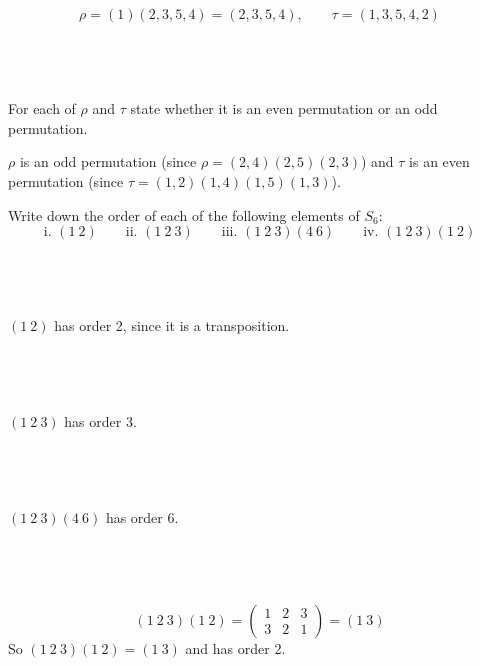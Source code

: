 \documentclass[a4paper]{article}
\begin{document}
\[ \rho = (1) (2, 3, 5, 4) = (2, 3, 5, 4), \qquad \tau = (1, 3, 5, 4, 2) \]

\newpage
\subsection{~} %

\begin{questionbody}
For each of $\rho$ and $\tau$ state whether it is an even permutation or an odd permutation.
\end{questionbody}

$\rho$ is an odd permutation (since $\rho = (2, 4) (2, 5) (2, 3)$) and $\tau$ is an even permutation (since $\tau = (1, 2) (1, 4) (1, 5) (1, 3)$).


\begin{questionbody}
Write down the order of each of the following elements of $S_6$: \[
\text{i. } (1\ 2)
\qquad \text{ii. } (1\ 2\ 3)
\qquad \text{iii. } (1\ 2\ 3) (4\ 6)
\qquad \text{iv. } (1\ 2\ 3) (1\ 2)
\]
\end{questionbody}

\subsection{~} %

$(1\ 2)$ has order 2, since it is a transposition.

\subsection{~} %

$(1\ 2\ 3)$ has order 3.

\subsection{~} %

$(1\ 2\ 3)(4\ 6)$ has order 6.

\subsection{~} %

\[ (1\ 2\ 3)(1\ 2) = \begin{pmatrix}1 & 2 & 3 \\ 3 & 2 & 1\end{pmatrix} = (1\ 3) \]
So $(1\ 2\ 3)(1\ 2) = (1\ 3)$ and has order 2.
\end{document}
